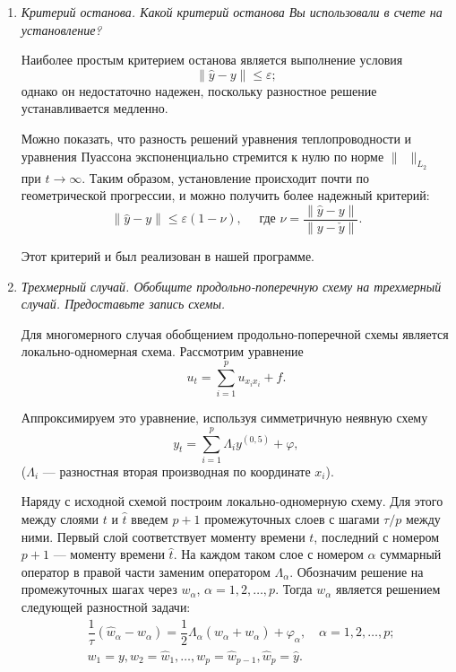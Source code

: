 \documentclass[12pt, a4paper]{article}
\begin{document}
\begin{enumerate}
		\item \textit{Критерий останова. Какой критерий останова Вы использовали в счете на установление?}
		\smallskip
		
		Наиболее простым критерием останова является выполнение условия
		\[
		\|\hat{y} - y\| \le \varepsilon;
		\]
		однако он недостаточно надежен, поскольку разностное решение устанавливается медленно.
		
		Можно показать\cite{kalitkin}, что разность решений уравнения теплопроводности и уравнения Пуассона экспоненциально стремится к нулю по норме $\|\phantom{1}\|_{L_2}$ при $t\rightarrow\infty$. Таким образом, установление происходит почти по геометрической прогрессии, и можно получить более надежный критерий:
		\[
		\|\hat{y}-y\| \le \varepsilon (1-\nu), \quad \text{ где } \nu = \frac{\|\hat{y}-y\|}{\|y-\check{y}\|}.
		\]
		
		Этот критерий и был реализован в нашей программе.
		
		\item \textit{Трехмерный случай. Обобщите продольно-поперечную схему на трехмерный случай. Предоставьте запись схемы.}
		\smallskip
		
		Для многомерного случая обобщением продольно-поперечной схемы является локально-одномерная схема. Рассмотрим уравнение
		\[
		u_t = \sum_{i = 1}^p u_{x_i x_i} + f.
		\]
		
		Аппроксимируем это уравнение, используя симметричную неявную схему
		\[
		y_t = \sum_{i = 1}^p \Lambda_i y^{(0,5)} + \varphi,
		\]
		($\Lambda_i$ --- разностная вторая производная по координате $x_i$).
		
		Наряду с исходной схемой построим локально-одномерную схему. Для этого между слоями $t$ и $\hat t$ введем $p + 1$ промежуточных слоев с шагами $\tau / p$ между ними. Первый слой соответствует моменту времени $t$, последний с номером $p+1$ --- моменту времени $\hat t$. На каждом таком слое с номером $\alpha$ суммарный оператор в правой части заменим оператором $\Lambda_\alpha$. Обозначим решение на промежуточных шагах через $w_\alpha$, $\alpha = 1, 2, \dots, p$. Тогда $w_\alpha$ является решением следующей разностной задачи:
		\begin{eqnarray*}
			& \dfrac1\tau (\hat w_\alpha - w_\alpha) = \dfrac12 \Lambda_\alpha(\hat w_\alpha + w_\alpha) + \varphi_\alpha, \quad \alpha = 1, 2, \dots, p; \\
			& w_1 = y, w_2 = \hat w_1, \dots, w_p = \hat w_{p-1}, \hat w_p = \hat y.
		\end{eqnarray*}
		

\end{enumerate}
\end{document}
